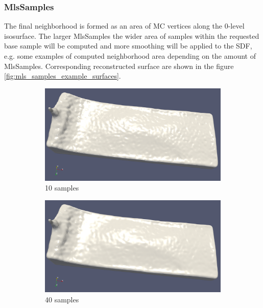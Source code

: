 \subsubsection{MlsSamples}
The final neighborhood is formed as an area of MC vertices along the 0-level isosurface. The larger MlsSamples the wider area of samples within the requested base sample will be computed and more smoothing will be applied to the SDF, e.g. some examples of computed neighborhood area depending on the amount of MlsSamples. Corresponding reconstructed surface are shown in the figure \ref{fig:mls_samples_example_surfaces}.
\begin{figure}[H]
	\begin{center}
		\begin{subfigure}[b]{0.49\textwidth}
			\includegraphics[width=\textwidth]{figures/MlsSamples10.png}
			\caption{10 samples}
		\end{subfigure}
		\begin{subfigure}[b]{0.49\textwidth}
			\includegraphics[width=\textwidth]{figures/MlsSamples40.png}
			\caption{40 samples}
		\end{subfigure}
		\begin{subfigure}[b]{0.49\textwidth}

\end{subfigure}
\end{center}
\end{figure}

